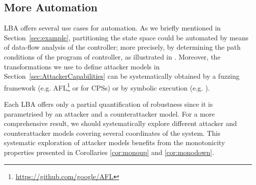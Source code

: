 {\subsection{More Automation}
LBA offers several use cases for automation. As we briefly mentioned in Section~\ref{sec:example}, partitioning the state space could be automated by means of data-flow analysis of the controller; more precisely, by determining the path conditions of the program of controller, as illustrated in \cite{castellanos2021AttkFinder}. Moreover, the transformations we use to define attacker models in Section~\ref{sec:AttackerCapabilities} can be systematically obtained by a fuzzing framework (e.g. AFL\footnote{\url{https://github.com/google/AFL}} or \cite{chen2019learning} for CPSs) or by symbolic execution (e.g. \cite{castellanos2021AttkFinder}).


Each LBA offers only a partial quantification of robustness since it is parametrised by an attacker and a counterattacker model. For a more comprehensive result, we should systematically explore different attacker and counterattacker models covering several coordinates of the system. This systematic exploration of attacker models benefits from the monotonicity properties presented in Corollaries \ref{cor:monoup} and \ref{cor:monodown}.


}
